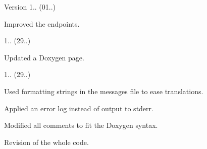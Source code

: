 \begin{DoxyVersion}{Version}
1.. (01..)
\begin{DoxyItemize}
\item Improved the endpoints. 
\end{DoxyItemize}

1.. (29..)
\begin{DoxyItemize}
\item Updated a Doxygen page. 
\end{DoxyItemize}

1.. (29..)
\begin{DoxyItemize}
\item Used formatting strings in the messages file to ease translations.
\item Applied an error log instead of output to stderr.
\item Modified all comments to fit the Doxygen syntax.
\item Revision of the whole code. 
\end{DoxyItemize}
\end{DoxyVersion}
